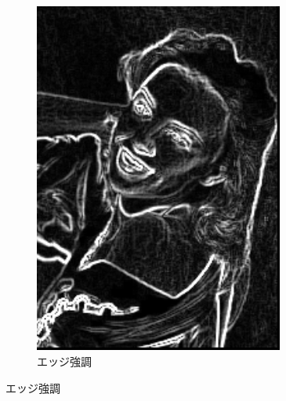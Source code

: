 \documentclass[a4paper,12pt]{jsarticle}
\begin{document}
\begin{figure}[!htbp]
\begin{subfigure}[b]{0.45\textwidth}
    \includegraphics[width=0.9\textwidth]{./images/edge_enhanced_sample8_edge.png}
    \caption{エッジ強調}
\end{subfigure}


\end{figure}
\end{document}
